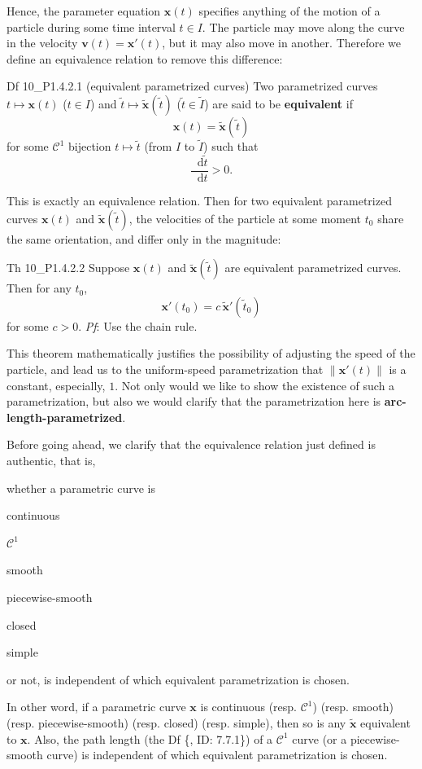 \documentclass{article}
\newcommand{\dif}{\mathop{}\!\mathrm{d}}
\begin{document}
Hence, the parameter equation $\pmb{x}(t)$ specifies anything of the motion of a particle during some time interval $t\in I$. The particle may move along the curve in the velocity $\pmb{v}(t) = \pmb{x}'(t)$, but it may also move in another. Therefore we define an equivalence relation to remove this difference:

\begin{Df}{Df 10\_P1.4.2.1 (equivalent parametrized curves)}
    Two parametrized curves $t\mapsto \pmb{x}(t)$ ($t\in I$) and $\tilde{t}\mapsto \tilde{\pmb{x}}(\tilde{t})$ ($\tilde{t}\in \tilde{I}$) are said to be \textbf{equivalent} if 
    $$ \pmb{x}(t) = \tilde{\pmb{x}}(\tilde{t}) $$
    for some $\mathcal{C}^1$ bijection $t\mapsto \tilde{t}$ (from $I$ to $\tilde{I}$) such that
    $$ \frac{\dif\tilde{t}}{\dif t} > 0. $$
\end{Df}

\textcolor{Th}{This is exactly an equivalence relation.} Then for two equivalent parametrized curves $\pmb{x}(t)$ and $\tilde{\pmb{x}}(\tilde{t})$, the velocities of the particle at some moment $t_0$ share the same orientation, and differ only in the magnitude:

\begin{Th}{Th 10\_P1.4.2.2}
    Suppose $\pmb{x}(t)$ and $\tilde{\pmb{x}}(\tilde{t})$ are equivalent parametrized curves. Then for any $t_0$,
    $$ \pmb{x}'(t_0) = c\, \tilde{\pmb{x}}'(\tilde{t}_0) $$
    for some $c>0$.
    \tcblower
    \textit{Pf}: Use the chain rule.
\end{Th}

This theorem mathematically justifies the possibility of adjusting the speed of the particle, and lead us to the uniform-speed parametrization that $\|\pmb{x}'(t)\|$ is a constant, especially, $1$. Not only would we like to show the existence of such a parametrization, but also we would clarify that the parametrization here is \textbf{arc-length-parametrized}.

Before going ahead, we clarify that the equivalence relation just defined is authentic, that is, \textcolor{Th}{whether a parametric curve is
\begin{compactenum}
    \item continuous
    \item $\mathcal{C}^1$
    \item smooth
    \item piecewise-smooth
    \item closed
    \item simple
\end{compactenum}
or not, is independent of which equivalent parametrization is chosen.} In other word, if a parametric curve $\pmb{x}$ is continuous (resp. $\mathcal{C}^1$) (resp. smooth) (resp. piecewise-smooth) (resp. closed) (resp. simple), then so is any $\tilde{\pmb{x}}$ equivalent to $\pmb{x}$. Also, \textcolor{Th}{the path length (the Df \{, ID: 7.7.1\}) of a $\mathcal{C}^1$ curve (or a piecewise-smooth curve) is independent of which equivalent parametrization is chosen}.
\end{document}
